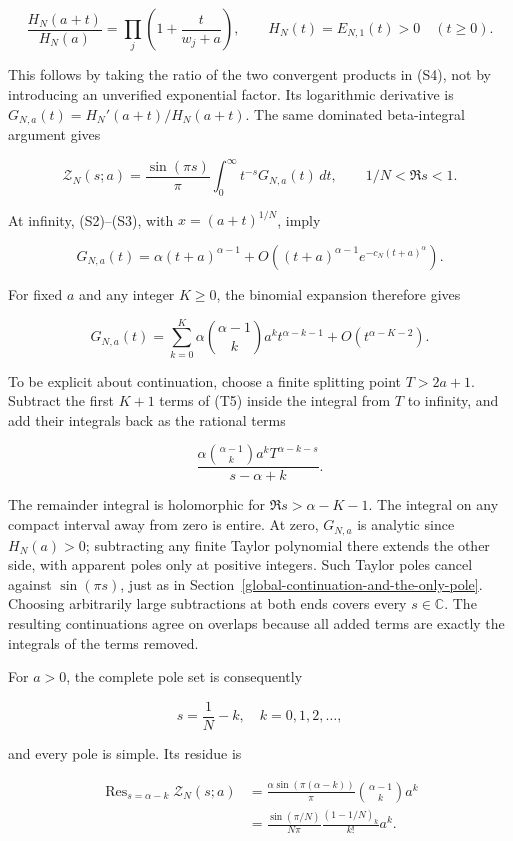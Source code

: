 \[
\frac{H_N(a+t)}{H_N(a)}
=\prod_j\left(1+\frac{t}{w_j+a}\right),\qquad
H_N(t)=E_{N,1}(t)>0\quad(t\ge0).
\tag{T2}
\]

This follows by taking the ratio of the two convergent products in (S4),
not by introducing an unverified exponential factor. Its logarithmic
derivative is \(G_{N,a}(t)=H_N'(a+t)/H_N(a+t)\). The same dominated
beta-integral argument gives

\[
\mathcal Z_N(s;a)=\frac{\sin(\pi s)}{\pi}
\int_0^\infty t^{-s}G_{N,a}(t)\,dt,
\qquad 1/N<\Re s<1.
\tag{T3}
\]

At infinity, (S2)--(S3), with \(x=(a+t)^{1/N}\), imply

\[
G_{N,a}(t)=\alpha(t+a)^{\alpha-1}
+O\!\left((t+a)^{\alpha-1}e^{-c_N(t+a)^\alpha}\right).
\tag{T4}
\]

For fixed \(a\) and any integer \(K\ge0\), the binomial expansion
therefore gives

\[
G_{N,a}(t)=\sum_{k=0}^{K}\alpha\binom{\alpha-1}{k}a^k t^{\alpha-k-1}
+O(t^{\alpha-K-2}).
\tag{T5}
\]

To be explicit about continuation, choose a finite splitting point
\(T>2a+1\). Subtract the first \(K+1\) terms of (T5) inside the integral
from \(T\) to infinity, and add their integrals back as the rational
terms

\[
\frac{\alpha\binom{\alpha-1}{k}a^k
 T^{\alpha-k-s}}{s-\alpha+k}.
\tag{T6}
\]

The remainder integral is holomorphic for \(\Re s>\alpha-K-1\). The
integral on any compact interval away from zero is entire. At zero,
\(G_{N,a}\) is analytic since \(H_N(a)>0\); subtracting any finite
Taylor polynomial there extends the other side, with apparent poles only
at positive integers. Such Taylor poles cancel against \(\sin(\pi s)\),
just as in Section~\ref{global-continuation-and-the-only-pole}. Choosing arbitrarily large subtractions at both
ends covers every \(s\in\mathbb C\). The resulting continuations agree
on overlaps because all added terms are exactly the integrals of the
terms removed.

For \(a>0\), the complete pole set is consequently

\[
\boxed{s=\frac1N-k,\quad k=0,1,2,\ldots,}
\]

and every pole is simple. Its residue is

\[
\begin{aligned}
\operatorname{Res}_{s=\alpha-k}\mathcal Z_N(s;a)
&=\frac{\alpha\sin(\pi(\alpha-k))}{\pi}
  \binom{\alpha-1}{k}a^k\\
&=\boxed{\frac{\sin(\pi/N)}{N\pi}
          \frac{(1-1/N)_k}{k!}a^k.}
\end{aligned}
\tag{T7}
\]

